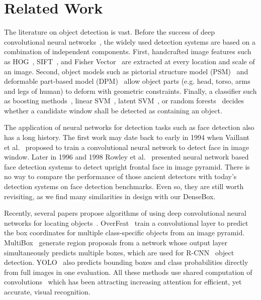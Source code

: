 \section{Related Work}

The literature on object detection is vast. Before the success of deep convolutional neural networks~\cite{krizhevsky2012imagenet}, the widely used detection systems are based on a combination of independent components. First, handcrafted image features such as HOG~\cite{dalal2005histograms}, SIFT~\cite{lowe2004distinctive}, and Fisher Vector~\cite{cinbis2013segmentation} are extracted at every location and scale of an image. Second, object models such as pictorial structure model (PSM)~\cite{felzenszwalb2005pictorial} and deformable part-based model (DPM)~\cite{felzenszwalb2010object, zhu2012face, yang2013articulated} allow object parts (e.g. head, torso, arms and legs of human) to deform with geometric constraints. Finally, a classifier such as boosting methods~\cite{viola2004robust}, linear SVM~\cite{dalal2005histograms}, latent SVM~\cite{felzenszwalb2010object}, or random forests~\cite{dollar2012crosstalk} decides whether a candidate window shall be detected as containing an object.  

The application of neural networks for detection tasks such as face detection also has a long history. The first work may date back to early in 1994 when Vaillant et al.~\cite{vaillant1994original} proposed to train a convolutional neural network to detect face in image window. Later in 1996 and 1998 Rowley et al.~\cite{rowley1998neural,rowley1998rotation} presented neural network based face detection systems to detect upright frontal face in image pyramid. There is no way to compare the performance of those ancient detectors with today’s detection systems on face detection benchmarks. Even so, they are still worth revisiting, as we find many similarities in design with our DenseBox. 

Recently, several papers propose algorithms of using deep convolutional neural networks for locating objects~\cite{sermanet2013overfeat, erhan2014scalable, YOLO}. OverFeat~\cite{sermanet2013overfeat} train a convolutional layer to predict the box coordinates for multiple class-specific objects from an image pyramid. MultiBox~\cite{erhan2014scalable} generate region proposals from a network whose output layer simultaneously predicts multiple boxes, which are used for R-CNN~\cite{girshick2014rich} object detection. YOLO~\cite{YOLO} also predicts bounding boxes and class probabilities directly from full images in one evaluation. All these methods use shared computation of convolutions~\cite{sermanet2013overfeat, he2014spatial, ren2015faster, long2015fully} which has been attracting increasing attention for efficient, yet accurate, visual recognition. 

